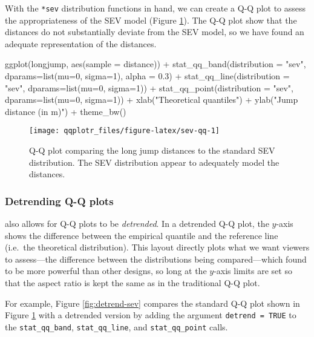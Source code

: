 With the \texttt{*sev} distribution functions in hand, we can create a
Q-Q plot to assess the appropriateness of the SEV model (Figure
\ref{fig:sev-qq}). The Q-Q plot show that the distances do not
substantially deviate from the SEV model, so we have found an adequate
representation of the distances.

\begin{Schunk}
\begin{Sinput}
ggplot(longjump, aes(sample = distance)) +
  stat_qq_band(distribution = "sev", dparams=list(mu=0, sigma=1), alpha = 0.3) +
  stat_qq_line(distribution = "sev", dparams=list(mu=0, sigma=1)) +
  stat_qq_point(distribution = "sev", dparams=list(mu=0, sigma=1)) +
  xlab("Theoretical quantiles") +
  ylab("Jump distance (in m)") +
  theme_bw()
\end{Sinput}
\begin{figure}

{\centering \texttt{[image: qqplotr\_files/figure-latex/sev-qq-1]} 

}

\caption[Q-Q plot comparing the long jump distances to the standard SEV distribution]{Q-Q plot comparing the long jump distances to the standard SEV distribution. The SEV distribution appear to adequately model the distances.}\label{fig:sev-qq}
\end{figure}
\end{Schunk}

\subsubsection{Detrending Q-Q plots}\label{detrending-q-q-plots}

 also allows for Q-Q plots to be \emph{detrended}. In a
detrended Q-Q plot, the \(y\)-axis shows the difference between the
empirical quantile and the reference line (i.e.~the theoretical
distribution). This layout directly plots what we want viewers to
assess---the difference between the distributions being compared---which
\citet{Loy2016-fg} found to be more powerful than other designs, so long
at the \(y\)-axis limits are set so that the aspect ratio is kept the
same as in the traditional Q-Q plot.

For example, Figure \ref{fig:detrend-sev} compares the standard Q-Q plot
shown in Figure \ref{fig:sev-qq} with a detrended version by adding the
argument \texttt{detrend\ =\ TRUE} to the \texttt{stat\_qq\_band},
\texttt{stat\_qq\_line}, and \texttt{stat\_qq\_point} calls.

